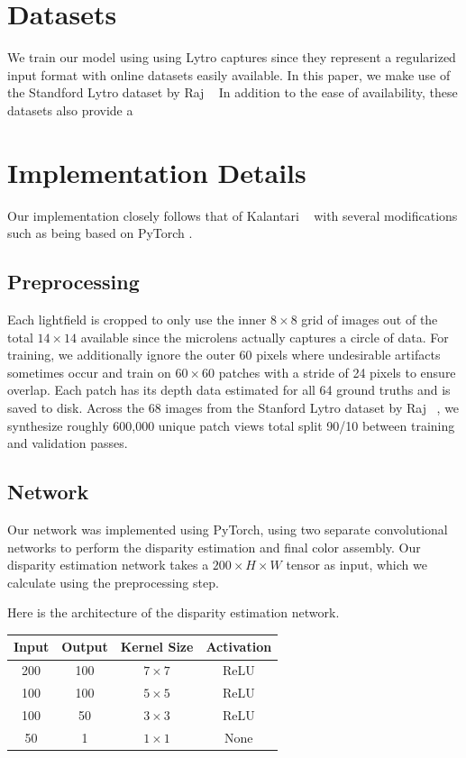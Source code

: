 \documentclass[10pt,twocolumn,letterpaper]{article}
\begin{document}
\section{Datasets}

We train our model using using Lytro captures since they represent a regularized input format with
online datasets easily available. In this paper, we make use of the Standford Lytro dataset by Raj \etal~\cite{StanfordLytro}
In addition to the ease of availability, these datasets also provide a 

\section{Implementation Details}

Our implementation closely follows that of Kalantari \etal~\cite{LearningViewSynthesis} with several modifications such
as being based on PyTorch \cite{PyTorch}.

\subsection{Preprocessing}

Each lightfield is cropped to only use the inner $8 \times 8$ grid of images out of the total $14 \times 14$ available
since the microlens actually captures a circle of data. For training, we additionally ignore the outer 60 pixels where
undesirable artifacts sometimes occur and train on $60\times60$ patches with a stride of 24 pixels to ensure overlap.
Each patch has its depth data estimated for all 64 ground truths and is saved to disk. Across the 68 images from the
Stanford Lytro dataset by Raj \etal~\cite{StanfordLytro}, we synthesize roughly 600,000 unique patch views total split
90/10 between training and validation passes.

\subsection{Network}

Our network was implemented using PyTorch, using two separate convolutional networks to perform the
disparity estimation and final color assembly. Our disparity estimation network takes a 
$200 \times H \times W$ tensor as input, which we calculate using the preprocessing step.

Here is the architecture of the disparity estimation network.

\begin{center}
\begin{tabular}{|c c c c|}
    Input & Output & Kernel Size & Activation \\
    \hline
    200 & 100 & $7 \times 7$ & ReLU \\
    100 & 100 & $5 \times 5$ & ReLU \\
    100 & 50 & $3 \times 3$ & ReLU \\
    50 & 1 & $1 \times 1$ & None \\
\end{tabular}
\end{center}
\end{document}
